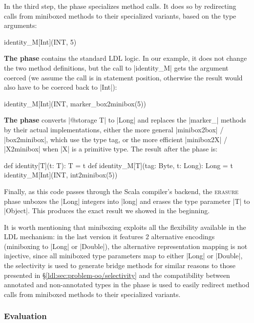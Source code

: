 In the third step, the \inject{} phase specializes method calls. It does so by redirecting calls from miniboxed methods to their specialized variants, based on the type arguments:

\begin{lstlisting-nobreak}
 identity_M[Int](INT, 5)
\end{lstlisting-nobreak}

\textbf{The \coerce{} phase} contains the standard LDL logic. In our example, it does not change the two method definitions, but the call to |identity_M| gets the argument coerced (we assume the call is in statement position, otherwise the result would also have to be coerced back to |Int|):

\begin{lstlisting-nobreak}
 identity_M[Int](INT, marker_box2minibox(5))
\end{lstlisting-nobreak}

\textbf{The \commit{} phase} converts |@storage T| to |Long| and replaces the |marker_| methods by their actual implementations, either the more general |minibox2box| / |box2minibox|, which use the type tag, or the more efficient |minibox2X| / |X2minibox| when |X| is a primitive type. The result after the \commit{} phase is:

\begin{lstlisting-nobreak}
 def identity[T](t: T): T = t
 def identity_M[T](tag: Byte, t: Long): Long = t
 identity_M[Int](INT, int2minibox(5))
\end{lstlisting-nobreak}

Finally, as this code passes through the Scala compiler's backend, the \textsc{erasure} phase unboxes the |Long| integers into |long| and erases the type parameter |T| to |Object|. This produces the exact result we showed in the beginning.

It is worth mentioning that miniboxing exploits all the flexibility available in the LDL mechanism: in the last version it features 2 alternative encodings (miniboxing to |Long| or |Double|), the alternative representation mapping is not injective, since all miniboxed type parameters map to either |Long| or |Double|, the selectivity is used to generate bridge methods for similar reasons to those presented in \S\ref{ldl:sec:problem-oo/selectivity} and the compatibility between annotated and non-annotated types in the \inject{} phase is used to easily redirect method calls from miniboxed methods to their specialized variants.

\subsubsection*{Evaluation}


